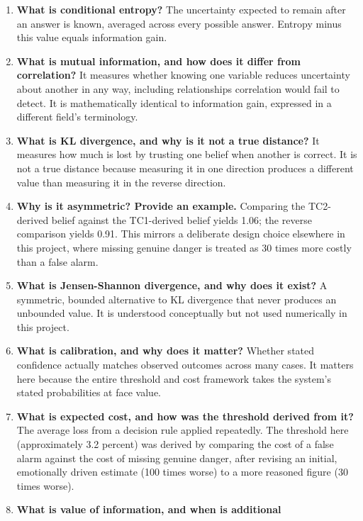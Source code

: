 \documentclass{article}
\begin{document}
\begin{enumerate}
  The expected reduction in uncertainty from a piece of evidence,
  averaged across every answer it could return. The fluid-intake
  question is worth 0.118 by this measure.
\item
  \textbf{What is conditional entropy?} The uncertainty expected to
  remain after an answer is known, averaged across every possible
  answer. Entropy minus this value equals information gain.
\item
  \textbf{What is mutual information, and how does it differ from
  correlation?} It measures whether knowing one variable reduces
  uncertainty about another in any way, including relationships
  correlation would fail to detect. It is mathematically identical to
  information gain, expressed in a different field's terminology.
\item
  \textbf{What is KL divergence, and why is it not a true distance?} It
  measures how much is lost by trusting one belief when another is
  correct. It is not a true distance because measuring it in one
  direction produces a different value than measuring it in the reverse
  direction.
\item
  \textbf{Why is it asymmetric? Provide an example.} Comparing the
  TC2-derived belief against the TC1-derived belief yields 1.06; the
  reverse comparison yields 0.91. This mirrors a deliberate design
  choice elsewhere in this project, where missing genuine danger is
  treated as 30 times more costly than a false alarm.
\item
  \textbf{What is Jensen-Shannon divergence, and why does it exist?} A
  symmetric, bounded alternative to KL divergence that never produces an
  unbounded value. It is understood conceptually but not used
  numerically in this project.
\item
  \textbf{What is calibration, and why does it matter?} Whether stated
  confidence actually matches observed outcomes across many cases. It
  matters here because the entire threshold and cost framework takes the
  system's stated probabilities at face value.
\item
  \textbf{What is expected cost, and how was the threshold derived from
  it?} The average loss from a decision rule applied repeatedly. The
  threshold here (approximately 3.2 percent) was derived by comparing
  the cost of a false alarm against the cost of missing genuine danger,
  after revising an initial, emotionally driven estimate (100 times
  worse) to a more reasoned figure (30 times worse).
\item
  \textbf{What is value of information, and when is additional
}
\end{enumerate}
\end{document}
